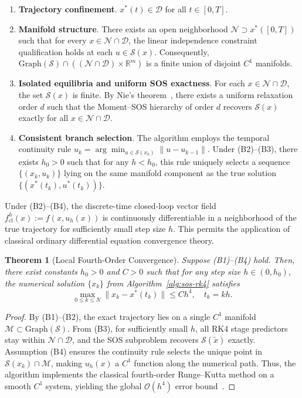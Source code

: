 \documentclass[sn-basic,Numbered]{sn-jnl}
\theoremstyle{thmstyleone}%
\newtheorem{theorem}{Theorem}%
\begin{document}
\begin{enumerate}[label=\textup{(B\arabic*)}, widest=(B4), left=0pt, align=left]
    \item \textbf{Trajectory confinement}. $x^*(t) \in \mathcal{D}$ for all $t \in [0,T]$.

    \item \textbf{Manifold structure}. There exists an open neighborhood $\mathcal{N} \supset x^*([0,T])$ such that for every $x \in \mathcal{N} \cap \mathcal{D}$, the linear independence constraint qualification holds at each $u \in \mathcal{S}(x)$. Consequently, $\mathrm{Graph}(\mathcal{S}) \cap ((\mathcal{N} \cap \mathcal{D}) \times \mathbb{R}^m)$ is a finite union of disjoint $C^1$ manifolds.

    \item \textbf{Isolated equilibria and uniform SOS exactness}. For each $x \in \mathcal{N} \cap \mathcal{D}$, the set $\mathcal{S}(x)$ is finite. By Nie's theorem~\cite[Thm.~3.3]{nie2013finite}, there exists a uniform relaxation order $d$ such that the Moment--SOS hierarchy of order $d$ recovers $\mathcal{S}(x)$ exactly for all $x \in \mathcal{N} \cap \mathcal{D}$.

    \item \textbf{Consistent branch selection}. The algorithm employs the temporal continuity rule $u_k = \arg\min_{u \in \mathcal{S}(x_k)} \|u - u_{k-1}\|$. Under (B2)--(B3), there exists $h_0 > 0$ such that for any $h < h_0$, this rule uniquely selects a sequence $\{(x_k, u_k)\}$ lying on the same manifold component as the true solution $\{(x^*(t_k), u^*(t_k))\}$.
\end{enumerate}

Under (B2)--(B4), the discrete-time closed-loop vector field $f_{\mathrm{cl}}^h(x) := f(x, u_h(x))$ is continuously differentiable in a neighborhood of the true trajectory for sufficiently small step size $h$. This permits the application of classical ordinary differential equation convergence theory.

\begin{theorem}[Local Fourth-Order Convergence]
\label{thm:convergence}
Suppose (B1)--(B4) hold. Then, there exist constants $h_0 > 0$ and $C > 0$ such that for any step size $h \in (0, h_0)$, the numerical solution $\{x_k\}$ from Algorithm~\ref{alg:sos-rk4} satisfies
\[
\max_{0 \leq k \leq N} \|x_k - x^*(t_k)\| \leq C h^4,
\quad t_k = kh.
\]
\end{theorem}

\begin{proof}
By (B1)--(B2), the exact trajectory lies on a single $C^1$ manifold $\mathcal{M} \subset \mathrm{Graph}(\mathcal{S})$. From (B3), for sufficiently small $h$, all RK4 stage predictors stay within $\mathcal{N} \cap \mathcal{D}$, and the SOS subproblem recovers $\mathcal{S}(\tilde{x})$ exactly. Assumption (B4) ensures the continuity rule selects the unique point in $\mathcal{S}(x_k) \cap \mathcal{M}$, making $u_h(x)$ a $C^1$ function along the numerical path. Thus, the algorithm implements the classical fourth-order Runge--Kutta method on a smooth $C^1$ system, yielding the global $\mathcal{O}(h^4)$ error bound~\cite{hairer1993solving}.
\end{proof}
\end{document}
